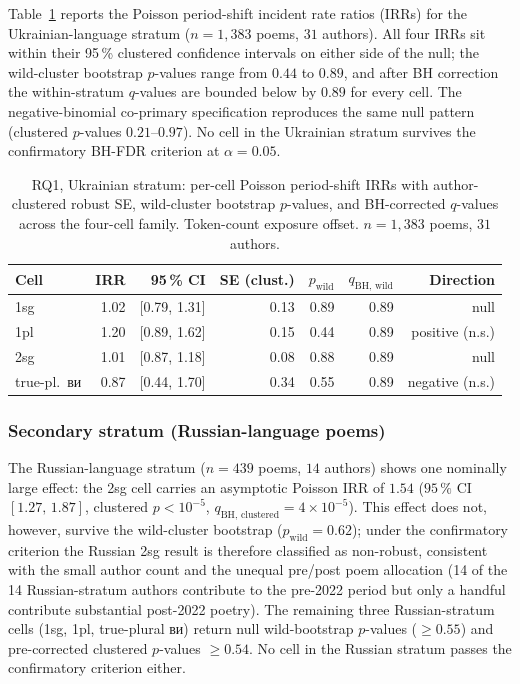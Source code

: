 \documentclass[12pt]{interact}
\theoremstyle{plain}%
\theoremstyle{definition}
\theoremstyle{remark}
\begin{document}
Table~\ref{tab:rq1-ukr} reports the Poisson period-shift incident rate ratios (IRRs) for the Ukrainian-language stratum ($n = 1{,}383$ poems, $31$ authors). All four IRRs sit within their 95\,\% clustered confidence intervals on either side of the null; the wild-cluster bootstrap $p$-values range from $0.44$ to $0.89$, and after BH correction the within-stratum $q$-values are bounded below by $0.89$ for every cell. The negative-binomial co-primary specification reproduces the same null pattern (clustered $p$-values $0.21$--$0.97$). No cell in the Ukrainian stratum survives the confirmatory BH-FDR criterion at $\alpha = 0.05$.

\begin{table}[h]
\caption{RQ1, Ukrainian stratum: per-cell Poisson period-shift IRRs with author-clustered robust SE, wild-cluster bootstrap $p$-values, and BH-corrected $q$-values across the four-cell family. Token-count exposure offset. $n = 1{,}383$ poems, $31$ authors.}
\label{tab:rq1-ukr}
\centering
\small
\begin{tabular}{lrrrrrr}
\toprule
Cell & IRR & 95\,\% CI & SE (clust.) & $p_{\text{wild}}$ & $q_{\text{BH, wild}}$ & Direction \\
\midrule
1sg & 1.02 & [0.79, 1.31] & 0.13 & 0.89 & 0.89 & null \\
1pl & 1.20 & [0.89, 1.62] & 0.15 & 0.44 & 0.89 & positive (n.s.) \\
2sg & 1.01 & [0.87, 1.18] & 0.08 & 0.88 & 0.89 & null \\
true-pl.~\textukrainian{ви} & 0.87 & [0.44, 1.70] & 0.34 & 0.55 & 0.89 & negative (n.s.) \\
\bottomrule
\end{tabular}
\end{table}

\subsubsection{Secondary stratum (Russian-language poems)}

The Russian-language stratum ($n = 439$ poems, $14$ authors) shows one nominally large effect: the 2sg cell carries an asymptotic Poisson IRR of $1.54$ ($95\,\%$ CI $[1.27,\,1.87]$, clustered $p < 10^{-5}$, $q_{\text{BH, clustered}} = 4 \times 10^{-5}$). This effect does not, however, survive the wild-cluster bootstrap ($p_{\text{wild}} = 0.62$); under the confirmatory criterion the Russian 2sg result is therefore classified as non-robust, consistent with the small author count and the unequal pre/post poem allocation (14 of the 14 Russian-stratum authors contribute to the pre-2022 period but only a handful contribute substantial post-2022 poetry). The remaining three Russian-stratum cells (1sg, 1pl, true-plural \textukrainian{ви}) return null wild-bootstrap $p$-values ($\geq 0.55$) and pre-corrected clustered $p$-values $\geq 0.54$. No cell in the Russian stratum passes the confirmatory criterion either.
\end{document}
